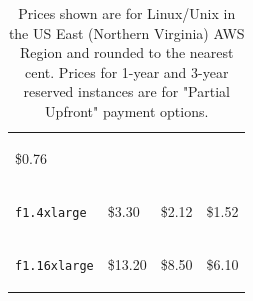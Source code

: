 \documentclass[a4paper]{article}
\begin{document}
\begin{table}[!htp]
\begin{tabular}{@{} p{5em} p{7em} p{10em} p{10em} @{}}
\begin{center}
                \vspace{-1.5em}
                \$0.76
            \end{center} \\
            \begin{center}
                \vspace{-2.5em}
                \texttt{f1.4xlarge}
            \end{center} &
            \begin{center}
                \vspace{-2em}
                \$3.30
            \end{center} & 
            \begin{center}
                \vspace{-2em}
                \$2.12
            \end{center} & 
            \begin{center}
                \vspace{-2em}
                \$1.52
            \end{center} \\
            \begin{center}
                \vspace{-2.5em}
                \texttt{f1.16xlarge}
                \vspace{-2em}
            \end{center} &
            \begin{center}
                \vspace{-2em}
                \$13.20
                \vspace{-2em}
            \end{center} & 
            \begin{center}
                \vspace{-2em}
                \$8.50
                \vspace{-2em}
            \end{center} & 
            \begin{center}
                \vspace{-2em}
                \$6.10
                \vspace{-2em}
            \end{center} \\
            \bottomrule
        \end{tabular}
        \caption{Prices shown are for Linux/Unix in the US East (Northern Virginia) AWS Region and rounded to the nearest cent. Prices for 1-year and 3-year reserved instances are for "Partial Upfront" payment options.}
        \label{tab: how much ec2 f1 costs}
    \end{table}
\end{document}
